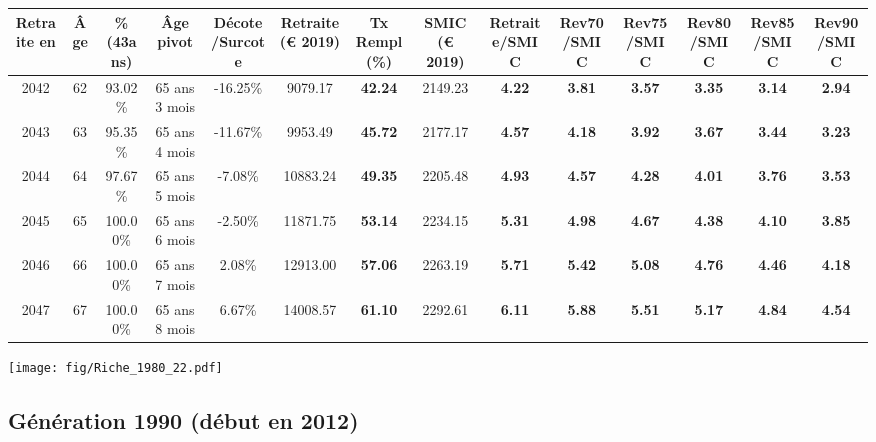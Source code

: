 \begin{adjustbox}{max width=\textwidth} 
\begin{tabular}[htb]{|c|c||c|c|c||c|c||c||c|c|c|c|c|c|} 
\hline 
 Retraite en &  Âge &  \%(43ans) &  Âge pivot &  Décote/Surcote &  Retraite (\euro{} 2019) &  Tx Rempl(\%) &  SMIC (\euro{} 2019) &  Retraite/SMIC &  Rev70/SMIC &  Rev75/SMIC &  Rev80/SMIC &  Rev85/SMIC &  Rev90/SMIC \\ 
\hline \hline 
 2042 &  62 &  93.02\% &  65 ans 3 mois &  -16.25\% &  9079.17 &  {\bf 42.24} &  2149.23 &  {\bf 4.22} &  {\bf 3.81} &  {\bf 3.57} &  {\bf 3.35} &  {\bf 3.14} &  {\bf 2.94} \\ 
\hline 
 2043 &  63 &  95.35\% &  65 ans 4 mois &  -11.67\% &  9953.49 &  {\bf 45.72} &  2177.17 &  {\bf 4.57} &  {\bf 4.18} &  {\bf 3.92} &  {\bf 3.67} &  {\bf 3.44} &  {\bf 3.23} \\ 
\hline 
 2044 &  64 &  97.67\% &  65 ans 5 mois &  -7.08\% &  10883.24 &  {\bf 49.35} &  2205.48 &  {\bf 4.93} &  {\bf 4.57} &  {\bf 4.28} &  {\bf 4.01} &  {\bf 3.76} &  {\bf 3.53} \\ 
\hline 
 2045 &  65 &  100.00\% &  65 ans 6 mois &  -2.50\% &  11871.75 &  {\bf 53.14} &  2234.15 &  {\bf 5.31} &  {\bf 4.98} &  {\bf 4.67} &  {\bf 4.38} &  {\bf 4.10} &  {\bf 3.85} \\ 
\hline 
 2046 &  66 &  100.00\% &  65 ans 7 mois &  2.08\% &  12913.00 &  {\bf 57.06} &  2263.19 &  {\bf 5.71} &  {\bf 5.42} &  {\bf 5.08} &  {\bf 4.76} &  {\bf 4.46} &  {\bf 4.18} \\ 
\hline 
 2047 &  67 &  100.00\% &  65 ans 8 mois &  6.67\% &  14008.57 &  {\bf 61.10} &  2292.61 &  {\bf 6.11} &  {\bf 5.88} &  {\bf 5.51} &  {\bf 5.17} &  {\bf 4.84} &  {\bf 4.54} \\ 
\hline 
\hline 
\end{tabular} 
\end{adjustbox} 
 
 \vspace{0.1cm} 

 \begin{center}\texttt{[image: fig/Riche\_1980\_22.pdf]}\end{center} \label{fig/Riche_1980_22.pdf} 

\newpage 
 
\subsection{Génération 1990 (début en 2012)} 

